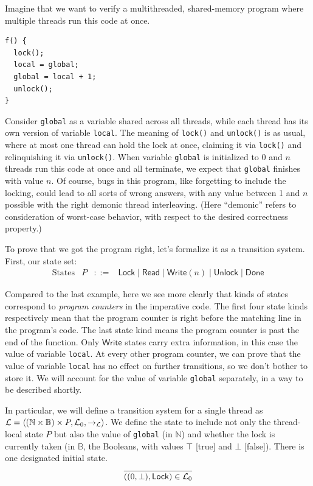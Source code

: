 \documentclass{amsbook}
\theoremstyle{definition}
\theoremstyle{remark}
\numberwithin{section}{chapter}
\numberwithin{equation}{chapter}
\begin{document}
Imagine that we want to verify a multithreaded, shared-memory program where multiple threads run this code at once.
\begin{verbatim}
f() {
  lock();
  local = global;
  global = local + 1;
  unlock();
}
\end{verbatim}

Consider \texttt{global} as a variable shared across all threads, while each thread has its own version of variable \texttt{local}.
The meaning of \texttt{lock()} and \texttt{unlock()} is as usual, where at most one thread can hold the lock at once, claiming it via \texttt{lock()} and relinquishing it via \texttt{unlock()}.
When variable \texttt{global} is initialized to 0 and $n$ threads run this code at once and all terminate, we expect that \texttt{global} finishes with value $n$.
Of course, bugs in this program, like forgetting to include the locking, could lead to all sorts of wrong answers, with any value between 1 and $n$ possible with the right demonic thread interleaving.
(Here ``demonic'' refers to consideration of worst-case behavior, with respect to the desired correctness property.)

\encoding
To prove that we got the program right, let's formalize it as a transition system.  First, our state set:
$$\begin{array}{rrcl}
  \textrm{States} & P &::=& \mathsf{Lock} \mid \mathsf{Read} \mid \mathsf{Write}(n) \mid \mathsf{Unlock} \mid \mathsf{Done}
\end{array}$$

Compared to the last example, here we see more clearly that kinds of states correspond to \emph{program counters} in the imperative code.
The first four state kinds respectively mean that the program counter is right before the matching line in the program's code.
The last state kind means the program counter is past the end of the function.
Only $\mathsf{Write}$ states carry extra information, in this case the value of variable \texttt{local}.
At every other program counter, we can prove that the value of variable \texttt{local} has no effect on further transitions, so we don't bother to store it.
We will account for the value of variable \texttt{global} separately, in a way to be described shortly.

In particular, we will define a transition system for a single thread as $\mathcal L = {\left \langle (\mathbb N \times \mathbb B) \times P, \mathcal L_0, \to_{\mathcal L} \right \rangle}$.
We define the state to include not only the thread-local state $P$ but also the value of \texttt{global} (in $\mathbb N$) and whether the lock is currently taken (in $\mathbb B$, the Booleans, with values $\top$ [true] and $\bot$ [false]).
There is one designated initial state.
$$\infer{((0, \bot), \mathsf{Lock}) \in \mathcal L_0}{}$$
\end{document}
